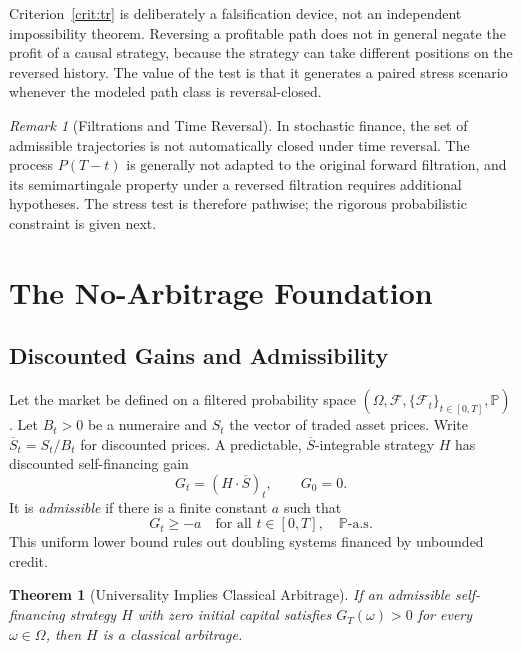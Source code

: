 \documentclass[aps,pra,reprint,superscriptaddress,amsmath,amssymb]{revtex4-2}
\theoremstyle{plain}
\newtheorem{theorem}{Theorem}
\theoremstyle{definition}
\theoremstyle{remark}
\newtheorem{remark}{Remark}
\begin{document}
Criterion~\ref{crit:tr} is deliberately a falsification device, not an
independent impossibility theorem. Reversing a profitable path does not in
general negate the profit of a causal strategy, because the strategy can take
different positions on the reversed history. The value of the test is that it
generates a paired stress scenario whenever the modeled path class is
reversal-closed.

\begin{remark}[Filtrations and Time Reversal]
In stochastic finance, the set of admissible trajectories is not automatically
closed under time reversal. The process \(P(T-t)\) is generally not adapted to
the original forward filtration, and its semimartingale property under a
reversed filtration requires additional hypotheses. The stress test is
therefore pathwise; the rigorous probabilistic constraint is given next.
\end{remark}

\section{The No-Arbitrage Foundation}
\label{sec:noarb}

\subsection{Discounted Gains and Admissibility}

Let the market be defined on a filtered probability space
\((\Omega,\mathcal{F},\{\mathcal{F}_t\}_{t\in[0,T]},\mathbb{P})\).
Let \(B_t>0\) be a numeraire and \(S_t\) the vector of traded asset prices.
Write \(\overline S_t=S_t/B_t\) for discounted prices. A predictable,
\(\overline S\)-integrable strategy \(H\) has discounted self-financing gain
\begin{equation}
  G_t=(H\mathbin{\cdot}\overline S)_t,\qquad G_0=0.
  \label{eq:gain}
\end{equation}
It is \emph{admissible} if there is a finite constant \(a\) such that
\begin{equation}
  G_t\geq -a\quad\text{for all }t\in[0,T],\quad\mathbb{P}\text{-a.s.}
  \label{eq:admissible}
\end{equation}
This uniform lower bound rules out doubling systems financed by unbounded
credit.

\begin{theorem}[Universality Implies Classical Arbitrage]
  \label{thm:arbitrage}
  If an admissible self-financing strategy \(H\) with zero initial capital
  satisfies \(G_T(\omega)>0\) for every \(\omega\in\Omega\), then \(H\) is a
  classical arbitrage.
\end{theorem}
\end{document}
